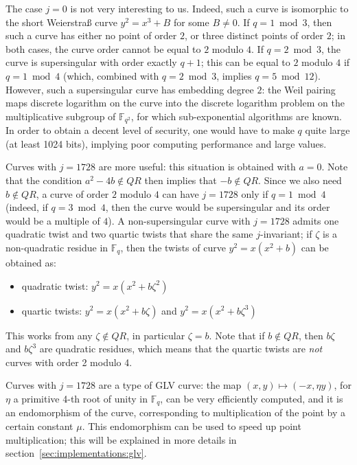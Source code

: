 \documentclass{llncs}
\newcommand{\QR}{QR}
\newcommand{\bF}{\mathbb{F}}
\begin{document}
The case $j = 0$ is not very interesting to us. Indeed, such a curve is
isomorphic to the short Weierstraß curve $y^2 = x^3 + B$ for some $B\neq
0$. If $q = 1 \bmod 3$, then such a curve has either no point of order
$2$, or three distinct points of order $2$; in both cases, the curve
order cannot be equal to $2$ modulo $4$. If $q = 2 \bmod 3$, the curve
is supersingular with order exactly $q+1$; this can be equal to $2$
modulo $4$ if $q = 1 \bmod 4$ (which, combined with $q = 2 \bmod 3$,
implies $q = 5 \bmod 12$). However, such a supersingular curve has
embedding degree $2$: the Weil pairing maps discrete logarithm on the
curve into the discrete logarithm problem on the multiplicative subgroup
of $\bF_{q^2}$, for which sub-exponential algorithms are
known\cite{MenOkaVan1993}. In order to obtain a decent level of
security, one would have to make $q$ quite large (at least 1024 bits),
implying poor computing performance and large values.

Curves with $j = 1728$ are more useful: this situation is obtained with
$a = 0$. Note that the condition $a^2 - 4b \notin \QR$ then implies that
$-b \notin \QR$. Since we also need $b \notin \QR$, a curve of order $2$
modulo $4$ can have $j = 1728$ only if $q = 1\bmod 4$ (indeed, if $q =
3\bmod 4$, then the curve would be supersingular and its order would be
a multiple of $4$). A non-supersingular curve with $j = 1728$ admits one
quadratic twist and two quartic twists that share the same
$j$-invariant; if $\zeta$ is a non-quadratic residue in $\bF_q$, then
the twists of curve $y^2 = x(x^2 + b)$ can be obtained as:
\begin{itemize}

    \item quadratic twist: $y^2 = x(x^2 + b\zeta^2)$

    \item quartic twists: $y^2 = x(x^2 + b\zeta)$ and
    $y^2 = x(x^2 + b\zeta^3)$

\end{itemize}
This works from any $\zeta \notin \QR$, in particular $\zeta = b$. Note
that if $b \notin \QR$, then $b\zeta$ and $b\zeta^3$ are quadratic
residues, which means that the quartic twists are \emph{not} curves
with order 2 modulo 4.

Curves with $j = 1728$ are a type of GLV curve\cite{GalLamVan2001}: the
map $(x, y) \mapsto (-x, \eta y)$, for $\eta$ a primitive 4-th root of
unity in $\bF_q$, can be very efficiently computed, and it is an
endomorphism of the curve, corresponding to multiplication of the point
by a certain constant $\mu$. This endomorphism can be used to speed up
point multiplication; this will be explained in more details in
section~\ref{sec:implementations:glv}.
\end{document}
